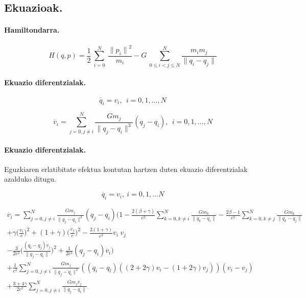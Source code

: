 \subsection{Ekuazioak.}

\paragraph*{Hamiltondarra.}

\begin{equation}
H(q,p)=\frac{1}{2}\ \sum^N_{i=0}{\ \frac{{\|p_i\|}^2}{m_i}}-G\ \sum^N_{0\le i<j\le N}{\frac{m_im_j}{\|q_i-q_j\|}} 
\end{equation}

\paragraph*{Ekuazio diferentzialak.}

\begin{equation}
\dot{q_i}=v_i, \ \  i=0,1,\dots, N
\end{equation}

\begin{equation}
\dot{v_i}= \sum_{j=0,j \neq i}^{N} \frac{Gm_j}{\|q_j-q_i\|^3} (q_j-q_i) , \ \  i=0,1,\dots, N
\end{equation}

\paragraph*{Ekuazio diferentzialak.}
Eguzkiaren erlatibitate efektua kontutan hartzen duten ekuazio diferentzialak azalduko ditugu.

\begin{equation}
\dot{q_i}=v_i, \  i=0,1,\dots N
\end{equation}

\begin{multline} 
\dot{v_i}= \sum_{j=0,j \neq i}^{N} \frac{Gm_j}{\|q_j-q_i\|^3} (q_j-q_i)
           \bigg(1- \frac{2(\beta+\gamma)}{c^2} \sum\limits_{k=0, k \neq i}^{N} \frac{Gm_k}{\|q_k-q_i\|} 
                  - \frac{2\beta-1}{c^2}        \sum\limits_{k=0, k \neq j}^{N} \frac{Gm_k}{\|q_k-q_j\|} \\
                  + \gamma \big(\frac{v_i}{c}\big)^2 + (1+\gamma) \big(\frac{v_j}{c} \big)^2 
                  - \frac{2(1+\gamma)}{c^2} v_i \ v_j \\
                  - \frac{3}{2c^2} \big(\frac{(q_i-q_j) v_j}{\|q_j-q_i\|} \big)^2+                  
                  \frac{1}{2c^2}(q_j-q_i) \dot{v_i} \bigg) \\
           + \frac{1}{c^2} \sum_{j=0,j \neq i}^{N} \frac{Gm_j}{\|q_j-q_i\|^3} 
             ((q_i-q_l) ((2+2\gamma)v_i-(1+2\gamma)v_j)) (v_i-v_j) \\
           + \frac{3+4\gamma}{2c^2} \sum_{j=0,j \neq i}^{N} \frac{Gm_j \dot{v_j}}{\|q_j-q_i\|}                                      
\end{multline}

